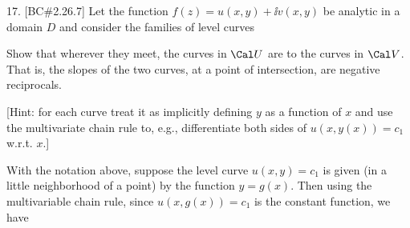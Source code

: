






\loadmsbm


\dl{\displaystyle}
\ctln{\centerline}
\ssk{\smallskip}
\msk{\medskip}
\bsk{\bigskip}
\del{\partial}


\overfullrule=0pt
\nopagenumbers






\bsk


\bsk


\item{17.} [BC\#2.26.7] Let the function $f(z)=u(x,y)+\ii v(x,y)$ be analytic in a domain $D$ and 
consider the families of level curves \hfill


\ssk




\ssk


\item{} Show that wherever they meet, the curves
in ${\Cal U}$ are  to the curves in ${\Cal V}$. That is, the slopes
of the two curves, at a point of intersection, are negative reciprocals. 


\msk


\item{} [Hint: for each curve
treat it as implicitly defining $y$ as a function of $x$ and use the multivariate chain rule
to, e.g., differentiate both sides of $u(x,y(x))=c_1$ w.r.t. $x$.]

\msk

\item{} With the notation above, suppose the level curve $u(x,y)=c_1$ is given (in a little
neighborhood of a point) by the function $y=g(x)$. Then using the multivariable 
chain rule, since $u(x,g(x))=c_1$ is the constant function, we have

\ssk


\ssk

